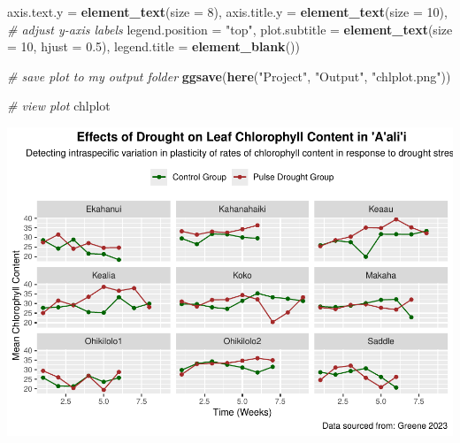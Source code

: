 \documentclass[
]{article}
\newenvironment{Shaded}{\begin{snugshade}}{\end{snugshade}}
\newcommand{\AttributeTok}[1]{\textcolor[rgb]{0.13,0.29,0.53}{#1}}
\newcommand{\CommentTok}[1]{\textcolor[rgb]{0.56,0.35,0.01}{\textit{#1}}}
\newcommand{\DecValTok}[1]{\textcolor[rgb]{0.00,0.00,0.81}{#1}}
\newcommand{\FloatTok}[1]{\textcolor[rgb]{0.00,0.00,0.81}{#1}}
\newcommand{\FunctionTok}[1]{\textcolor[rgb]{0.13,0.29,0.53}{\textbf{#1}}}
\newcommand{\NormalTok}[1]{#1}
\newcommand{\StringTok}[1]{\textcolor[rgb]{0.31,0.60,0.02}{#1}}
\begin{document}
\begin{Shaded}
\begin{Highlighting}[]
        \AttributeTok{axis.text.y =} \FunctionTok{element\_text}\NormalTok{(}\AttributeTok{size =} \DecValTok{8}\NormalTok{), }\AttributeTok{axis.title.y =} \FunctionTok{element\_text}\NormalTok{(}\AttributeTok{size =} \DecValTok{10}\NormalTok{),   }\CommentTok{\# adjust y{-}axis labels}
        \AttributeTok{legend.position =} \StringTok{"top"}\NormalTok{, }
        \AttributeTok{plot.subtitle =} \FunctionTok{element\_text}\NormalTok{(}\AttributeTok{size =} \DecValTok{10}\NormalTok{, }\AttributeTok{hjust =} \FloatTok{0.5}\NormalTok{), }
        \AttributeTok{legend.title =} \FunctionTok{element\_blank}\NormalTok{())}

\CommentTok{\# save plot to my output folder}
\FunctionTok{ggsave}\NormalTok{(}\FunctionTok{here}\NormalTok{(}\StringTok{"Project"}\NormalTok{, }\StringTok{"Output"}\NormalTok{, }\StringTok{"chlplot.png"}\NormalTok{)) }

\CommentTok{\# view plot}
\NormalTok{chlplot}
\end{Highlighting}
\end{Shaded}

\includegraphics{../Output/unnamed-chunk-2-1.pdf}
\end{document}
